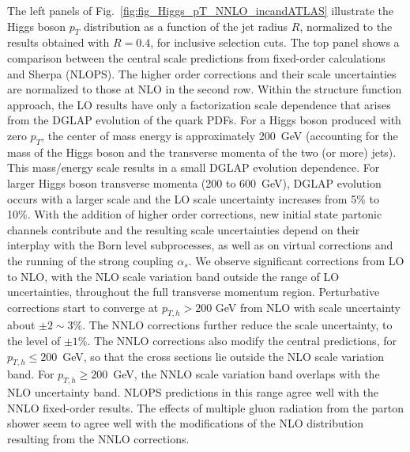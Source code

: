 \documentclass[10pt,prd,fleqn,superscriptaddress,notitlepage,nofootinbib,preprintnumbers,nobalancelastpage]{revtex4-1}
\begin{document}
The left panels of Fig.~\ref{fig:fig_Higgs_pT_NNLO_incandATLAS} illustrate the Higgs boson $p_T$ distribution as a function of the jet radius $R$, normalized to the results obtained with $R=0.4$, for inclusive selection cuts. The top panel shows a comparison between the central scale predictions from fixed-order calculations and Sherpa (NLOPS). The
higher order corrections and their scale uncertainties are normalized to those at NLO in the second row. Within the structure function approach, the LO results  have only a factorization scale dependence that arises from the DGLAP evolution of the quark PDFs. For a  Higgs boson produced with zero $p_T$, the center of mass energy is approximately 200~GeV (accounting for  the mass of the Higgs boson and the transverse momenta of the two (or more) jets). This mass/energy scale results in a small DGLAP evolution dependence.
For larger Higgs boson transverse momenta (200 to 600~GeV),  DGLAP evolution occurs  with a larger scale and the LO scale uncertainty increases from 5\% to 10\%.  With the addition of  higher order corrections, new initial state partonic channels  contribute and the resulting scale uncertainties depend on their interplay with the Born level subprocesses,  as well as on virtual corrections and the running of the strong coupling $\alpha_s$. We observe significant corrections from LO to NLO, with the NLO scale variation band outside the range of LO uncertainties, throughout the full transverse momentum region. Perturbative corrections start to converge at $p_{T,h}>200$ GeV from NLO with scale uncertainty about $\pm2\sim 3\%$. The NNLO corrections further reduce the scale uncertainty, to the level of $\pm 1$\%. The NNLO corrections also modify the central predictions, for $p_{T,h}\le 200$~GeV, so that the cross sections lie outside the NLO scale variation band. For $p_{T,h}\ge 200$~GeV, the NNLO scale variation band overlaps with the NLO uncertainty band. NLOPS predictions in this range  agree well with the NNLO fixed-order results. The effects of multiple gluon radiation from the parton shower seem to agree well with  the modifications of the NLO distribution resulting from the NNLO corrections.
\end{document}
